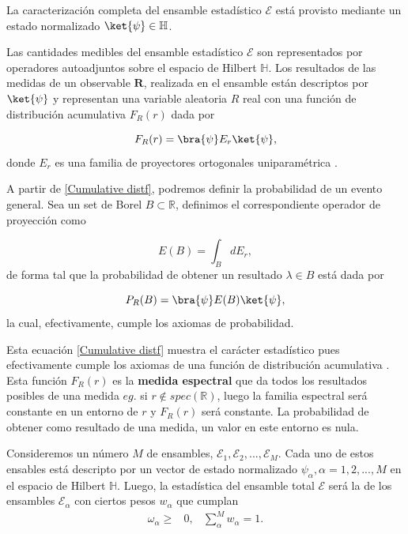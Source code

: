  \begin{post}
 \label{Post1} La caracterización completa del ensamble estadístico $\mathcal{E}$ está provisto mediante un estado normalizado $\ket{\psi} \in \mathbb{H}$.
 \end{post}
 \begin{post} \label{Post2}
 Las cantidades medibles del ensamble estadístico $\mathcal{E}$ son representados por operadores autoadjuntos sobre el espacio de Hilbert $\mathbb{H}$. Los resultados de las medidas de un observable $\mathbf{R}$, realizada en el ensamble están descriptos por $\ket{\psi}$ y representan una variable aleatoria $R$ real con una función de distribución acumulativa $F_R(r)$ dada por 
 
 \begin{equation}
     F_R (r) = \bra{\psi}E_r \ket{\psi},
     \label{Cumulative distf}
 \end{equation}
 donde $E_r$ es una familia de proyectores ortogonales uniparamétrica \cite[p.~60]{HeinzPetruccione}.
 \end{post}
 
 A partir de \eqref{Cumulative distf}, podremos definir la probabilidad de un evento general. Sea un set de Borel $B \subset \mathbb{R}$, definimos el correspondiente operador de proyección como 
 
 \begin{equation}
     E (B) = \int_{B} dE_r,
 \end{equation}
 de forma tal que la probabilidad de obtener un resultado $\lambda \in B$ está dada por
 
 \begin{equation}
     P_R (B) = \bra{\psi}E(B)\ket{\psi},
 \end{equation}
 la cual, efectivamente, cumple los axiomas de probabilidad. 
 
  Esta ecuación \eqref{Cumulative distf} muestra el carácter estadístico pues efectivamente cumple los axiomas de una función de distribución acumulativa \cite[p.~7]{HeinzPetruccione}. Esta función $F_R (r)$ es la \textbf{medida espectral} que da todos los resultados posibles de una medida $eg.$ si $r \notin spec(\mathbb{R})$, luego la familia espectral será constante en un entorno de $r$ y $F_R (r)$ será constante. La probabilidad de obtener como resultado de una medida, un valor en este entorno es nula.
 
 Consideremos un número $M$ de ensambles, $\mathcal{E}_1, \mathcal{E}_2, ..., \mathcal{E}_M$. Cada uno de estos ensables está descripto por un vector de estado normalizado $\psi_{\alpha}, \alpha = 1,2,...,M$ en el espacio de Hilbert $\mathbb{H}$. Luego, la estadística del ensamble total $\mathcal{E}$ será la de los ensambles $\mathcal{E}_{\alpha}$ con ciertos pesos $w_{\alpha}$ que cumplan 
 \begin{align*}
 \omega_{\alpha} \geq & 0, &  \sum_{\alpha}^{M} w_{\alpha} = 1.    
 \end{align*}
 
